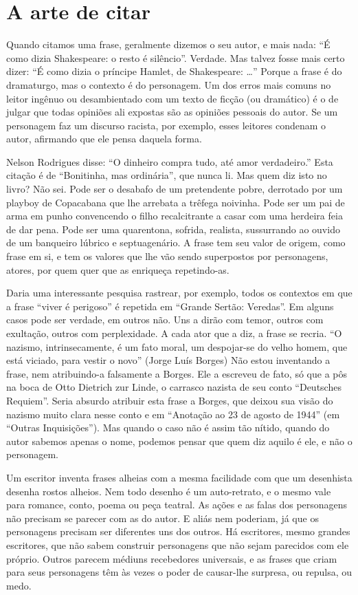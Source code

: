 \chapter{A arte de citar}

Quando citamos uma frase, geralmente dizemos o seu autor, e mais nada:
“É como dizia Shakespeare: o resto é silêncio”.  Verdade. Mas talvez
fosse mais certo dizer: “É como dizia o príncipe Hamlet, de
Shakespeare: …”  Porque a frase é do dramaturgo, mas o contexto é do
personagem. Um dos erros mais comuns no leitor ingênuo ou
desambientado com um texto de ficção (ou dramático) é o de julgar que
todas opiniões ali expostas são as opiniões pessoais do autor. Se um
personagem faz um discurso racista, por exemplo, esses leitores
condenam o autor, afirmando que ele pensa daquela forma.  

Nelson Rodrigues disse: “O dinheiro compra tudo, até amor verdadeiro.”
Esta citação é de “Bonitinha, mas ordinária”, que nunca li. Mas quem
diz isto no livro? Não sei. Pode ser o desabafo de um pretendente
pobre, derrotado por um playboy de Copacabana que lhe arrebata a
trêfega noivinha. Pode ser um pai de arma em punho convencendo o
filho recalcitrante a casar com uma herdeira feia de dar pena. Pode
ser uma quarentona, sofrida, realista, sussurrando ao ouvido de um
banqueiro lúbrico e septuagenário.  A frase tem seu valor de origem,
como frase em si, e tem os valores que lhe vão sendo superpostos por
personagens, atores, por quem quer que as enriqueça repetindo-as.

Daria uma interessante pesquisa rastrear, por exemplo, todos os
contextos em que a frase “viver é perigoso” é repetida em “Grande
Sertão: Veredas”. Em alguns casos pode ser verdade, em outros não.
Uns a dirão com temor, outros com exultação, outros com perplexidade.
A cada ator que a diz, a frase se recria. “O nazismo,
intrinsecamente, é um fato moral, um despojar-se do velho homem, que
está viciado, para vestir o novo” (Jorge Luís Borges) Não estou
inventando a frase, nem atribuindo-a falsamente a Borges. Ele a
escreveu de fato, só que a pôs na boca de Otto Dietrich zur Linde, o
carrasco nazista de seu conto “Deutsches Requiem”. Seria absurdo
atribuir esta frase a Borges, que deixou sua visão do nazismo muito
clara nesse conto e em “Anotação ao 23 de agosto de 1944” (em “Outras
Inquisições”). Mas quando o caso não é assim tão nítido, quando do
autor sabemos apenas o nome, podemos pensar que quem diz aquilo é
ele, e não o personagem. 

Um escritor inventa frases alheias com a mesma facilidade com que um
desenhista desenha rostos alheios. Nem todo desenho é um
auto-retrato, e o mesmo vale para romance, conto, poema ou peça
teatral.  As ações e as falas dos personagens não precisam se parecer
com as do autor. E aliás nem poderiam, já que os personagens precisam
ser diferentes uns dos outros. Há escritores, mesmo grandes
escritores, que não sabem construir personagens que não sejam
parecidos com ele próprio. Outros parecem médiuns recebedores
universais, e as frases que criam para seus personagens têm às vezes
o poder de causar-lhe surpresa, ou repulsa, ou medo.

